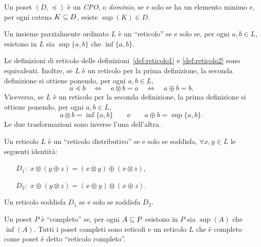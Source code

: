 \begin{definizione} 
\label{def:cpo}
Un poset $(D, \preceq)$ \`e un \emph{CPO}, o \emph{dominio}, se e solo se
ha un elemento minimo e, per ogni catena $K \subseteq D$, esiste $\sup(K) \in D$.
\end{definizione}

\begin{definizione}  
\label{def:reticolo2}
Un insieme parzialmente ordinato $L$ \`e un ``reticolo'' se e solo se,
per ogni $a, b \in L$, esistono in $L$ sia $\sup\{a,b\}$ che $\inf\{a,b\}$.
\end{definizione}

\begin{proposizione}
\textup{\cite{BurrisS81}} Le definizioni di reticolo
delle definizioni~\textup{\ref{def:reticolo1}} e \textup{\ref{def:reticolo2}}
sono equivalenti.
Inoltre, se $L$ \`e
un reticolo per la prima definizione, la seconda definizione si ottiene
ponendo, per ogni $a,b \in L$,
\[
    a \preceq b \quad\iff\quad a \otimes b = a \quad\iff\quad a \oplus b = b.
\]
Viceversa, se $L$ \`e un reticolo per la seconda definizione,
la prima definizione si ottiene ponendo, per ogni $a,b \in L$,
\[
    a \otimes b = \inf\{a,b\} \qquad\mbox{e}\qquad a \oplus b = \sup\{a,b\}.
\]
Le due trasformazioni sono inverse l'una dell'altra.
\end{proposizione}

\begin{definizione}
Un reticolo $L$ \`e un ``reticolo distributivo'' se e solo se soddisfa,
$\forall x, y \in L$ le seguenti identit\`a:
\begin{itemize}
\item[$D_1:$] $x \otimes (y \oplus   z) = (x \otimes y) \oplus  (x \otimes z)$,
\item[$D_2:$] $x \oplus  (y \otimes  z) = (x \oplus  y) \otimes (x \oplus  z)$.
\end{itemize}
\end{definizione}

\begin{proposizione}
{\rm \cite{BurrisS81}} Un reticolo soddisfa $D_1$ se e solo se soddisfa $D_2$.
\end{proposizione}

\begin{definizione}
Un poset $P$ \`e ``completo'' se, per ogni $A \subseteq P$ esistono in $P$ sia
$\sup(A)$ che $\inf(A)$. Tutti i poset completi sono reticoli e un reticolo
$L$ che \`e completo come poset \`e detto ``reticolo completo''.
\end{definizione}

